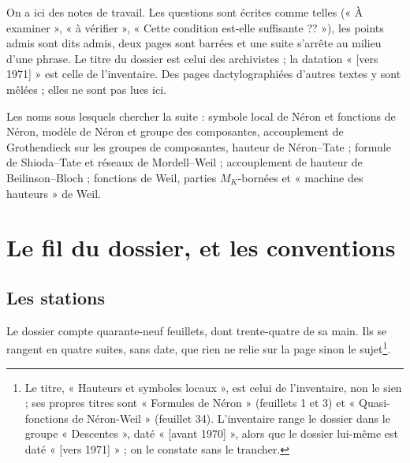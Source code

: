 \documentclass[11pt,a4paper]{article}
\begin{document}
\begin{resume}
On a ici des notes de travail. Les questions sont écrites comme telles
(« À examiner », « à vérifier », « Cette condition est-elle
suffisante ?? »), les points admis sont dits admis, deux pages sont
barrées et une suite s'arrête au milieu d'une phrase. Le titre du dossier
est celui des archivistes ; la datation « [vers 1971] » est celle de
l'inventaire. Des pages dactylographiées d'autres textes y sont
mêlées ; elles ne sont pas lues ici.

Les noms sous lesquels chercher la suite : symbole local de Néron et
fonctions de Néron, modèle de Néron et groupe des composantes,
accouplement de Grothendieck sur les groupes de composantes, hauteur de
Néron–Tate ; formule de Shioda–Tate et réseaux de Mordell–Weil ; accouplement
de hauteur de Beilinson–Bloch ; fonctions de Weil, parties $M_K$-bornées et
« machine des hauteurs » de Weil.

\end{resume}

\section*{Le fil du dossier, et les conventions}

\subsection*{Les stations}

Le dossier compte quarante-neuf feuillets, dont trente-quatre de sa main.
Ils se rangent en quatre suites, sans date, que rien ne relie sur la page
sinon le sujet\footnote{Le titre, « Hauteurs et symboles locaux », est
celui de l'inventaire, non le sien ; ses propres titres sont « Formules de
Néron » (feuillets 1 et 3) et « Quasi-fonctions de Néron-Weil » (feuillet
34). L'inventaire range le dossier dans le groupe « Descentes », daté
« [avant 1970] », alors que le dossier lui-même est daté « [vers 1971] » ;
on le constate sans le trancher.}.
\end{document}

